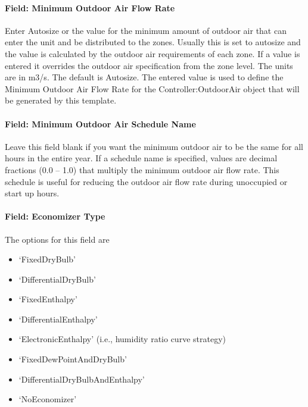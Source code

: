 \paragraph{Field: Minimum Outdoor Air Flow Rate}\label{field-minimum-outdoor-air-flow-rate-2}

Enter Autosize or the value for the minimum amount of outdoor air that can enter the unit and be distributed to the zones. Usually this is set to autosize and the value is calculated by the outdoor air requirements of each zone. If a value is entered it overrides the outdoor air specification from the zone level. The units are in m3/s. The default is Autosize. The entered value is used to define the Minimum Outdoor Air Flow Rate for the Controller:OutdoorAir object that will be generated by this template.

\paragraph{Field: Minimum Outdoor Air Schedule Name}\label{field-minimum-outdoor-air-schedule-name-2}

Leave this field blank if you want the minimum outdoor air to be the same for all hours in the entire year. If a schedule name is specified, values are decimal fractions (0.0 -- 1.0) that multiply the minimum outdoor air flow rate. This schedule is useful for reducing the outdoor air flow rate during unoccupied or start up hours.

\paragraph{Field: Economizer Type}\label{field-economizer-type-2}

The options for this field are

\begin{itemize}
\item
  `FixedDryBulb'
\item
  `DifferentialDryBulb'
\item
  `FixedEnthalpy'
\item
  `DifferentialEnthalpy'
\item
  `ElectronicEnthalpy' (i.e., humidity ratio curve strategy)
\item
  `FixedDewPointAndDryBulb'
\item
  `DifferentialDryBulbAndEnthalpy'
\item
  `NoEconomizer'
\end{itemize}

